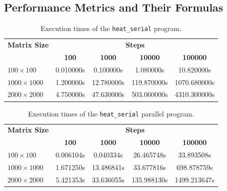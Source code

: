 \documentclass[12pt]{article}
\begin{document}
\subsection{Performance Metrics and Their Formulas}


\begin{table}[h!]
	\centering
	\begin{tabular}{lcccc}
		\hline
		\textbf{Matrix Size} & \multicolumn{4}{c}{\textbf{Steps}}                                                    \\
		\cline{2-5}
		                     & \textbf{100}                       & \textbf{1000} & \textbf{10000} & \textbf{100000} \\
		\hline
		$100\times 100$      & 0.010000s                          & 0.100000s     & 1.080000s      & 10.820000s      \\
		$1000\times 1000$    & 1.200000s                          & 12.780000s    & 119.870000s    & 1070.680000s    \\
		$2000\times 2000$    & 4.750000s                          & 47.630000s    & 503.060000s    & 4310.300000s    \\
		\hline
	\end{tabular}
	\caption{Execution times of the \texttt{heat\_serial} program.}
	\label{tab:serial_times}
\end{table}

\begin{table}[h!]
	\centering
	\begin{tabular}{lcccc}
		\hline
		\textbf{Matrix Size} & \multicolumn{4}{c}{\textbf{Steps}}                                                    \\
		\cline{2-5}
		                     & \textbf{100}                       & \textbf{1000} & \textbf{10000} & \textbf{100000} \\
		\hline
		$100\times 100$      & 0.006104s                          & 0.040334s     & 26.465748s     & 33.893508s      \\
		$1000\times 1000$    & 1.671250s                          & 13.486841s    & 33.677816s     & 698.878759s     \\
		$2000\times 2000$    & 5.421353s                          & 33.636055s    & 135.988130s    & 1499.213647s    \\
		\hline
	\end{tabular}
	\caption{Execution times of the \texttt{heat\_serial} parallel program.}
	\label{tab:omp_times}
\end{table}
\end{document}
